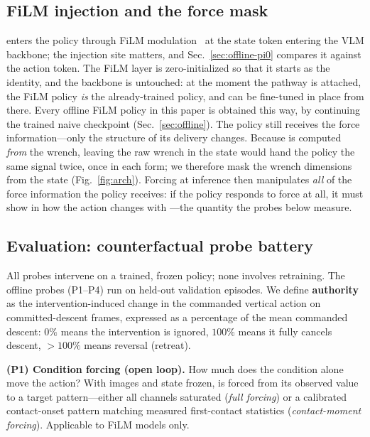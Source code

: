\subsection{FiLM injection and the force mask}
\label{sec:method-mask}
\chat{} enters the policy through FiLM modulation~\cite{perez2018film} at the state token
entering the VLM backbone; the injection site matters, and Sec.~\ref{sec:offline-pi0} compares
it against the action token.
The FiLM layer is zero-initialized so that it starts as the identity, and the backbone is
untouched: at the moment the pathway is attached, the FiLM policy \emph{is} the
already-trained policy, and can be fine-tuned in place from there. Every offline FiLM
policy in this paper is obtained this way, by continuing the trained naive checkpoint
(Sec.~\ref{sec:offline}).
The policy still receives the force information---only the structure of its delivery changes.
Because \chat{} is computed \emph{from} the wrench, leaving the raw wrench in the state would
hand the policy the same signal twice, once in each form; we therefore mask the wrench
dimensions from the state (Fig.~\ref{fig:arch}). Forcing \chat{} at inference then manipulates
\emph{all} of the force information the policy receives: if the policy responds to force at
all, it must show in how the action changes with \chat{}---the quantity the probes below
measure.

\subsection{Evaluation: counterfactual probe battery}
\label{sec:method-probes}
All probes intervene on a trained, frozen policy; none involves retraining. The offline probes
(P1--P4) run on held-out validation episodes. We define
\textbf{authority} as the intervention-induced change in the commanded vertical action on
committed-descent frames, expressed as a percentage of the mean commanded descent: $0\%$ means
the intervention is ignored, $100\%$ means it fully cancels descent, ${>}100\%$ means reversal
(retreat).

\textbf{(P1) Condition forcing (open loop).} How much does the condition alone move the
action? With images and state frozen, \chat{} is forced from its observed value to a target
pattern---either all channels saturated (\emph{full forcing}) or a calibrated contact-onset
pattern matching measured first-contact statistics (\emph{contact-moment forcing}). Applicable
to FiLM models only.

